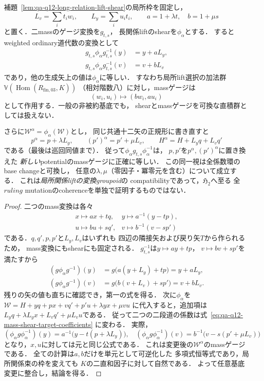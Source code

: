 \begin{proposition}[massゲージと長関係liftのshearの半直積関係]
\label{prop:qa-q12-mass-shear-compatibility}
補題~\ref{lem:qa-q12-long-relation-lift-shear}の局所枠を固定し，
\[
 L_v=\sum_i t_iw_i,\qquad L_y=\sum_i u_it_i,\qquad
 a=1+\lambda t,\quad b=1+\mu s
\]
と置く．二massのゲージ変換を$g_{t,s}$，
長関係liftのshearを$\phi_\alpha$とする．
するとweighted ordinary道代数の変換として
\[
 \begin{aligned}
 g_{t,s}\phi_\alpha g_{t,s}^{-1}(y)&=y+aL_y,\\
 g_{t,s}\phi_\alpha g_{t,s}^{-1}(v)&=v+bL_v
 \end{aligned}
 \tag{MS}\label{eq:qa-q12-mass-shear-conjugation}
\]
であり，他の生成矢上の値は$\phi_\alpha$に等しい．
すなわち局所lift選択の加法群
$\mathbb V(\operatorname{Hom}(R_{{\mathrm{fin}},03},K))$
（相対階数八）に対し，massゲージは
\[
 (w_i,u_i)\longmapsto(bw_i,au_i)
\]
として作用する．一般の非被約基底でも，
shearとmassゲージを可換な直積群としては扱えない．

さらに$\mathcal W^\alpha=\phi_\alpha(\mathcal W)$とし，
同じ共通十二矢の正規形に書き直すと
\[
 p^\alpha=p+\lambda L_y,\qquad
 (p')^\alpha=p'+\mu L_v,\qquad
 H^\alpha=H+L_yq+L_vq'
 \tag{TC}\label{eq:qa-q12-mass-shear-target-coefficients}
\]
である（最後は巡回同値まで）．
従って$\phi_\alpha g_{t,s}\phi_\alpha^{-1}$は，
$p,p'$を$p^\alpha,(p')^\alpha$に置き換えた
\emph{新しい}potentialのmassゲージに正確に等しい．
この同一視は全係数環のbase changeと可換し，
任意の$\lambda,\mu$（零因子・冪零元を含む）について成立する．
これは\emph{局所関係liftの変換groupoid}の
compatibilityであって，$\mathfrak H_2$へ至る
全$ruling$ mutationのcoherenceを単独で証明するものではない．
\end{proposition}
\begin{proof}
二つのmass変換は各々
\[
 \begin{array}{ll}
 x\mapsto ax+tq,&y\mapsto a^{-1}(y-tp),\\
 u\mapsto bu+sq',&v\mapsto b^{-1}(v-sp')
 \end{array}
\]
である．$q,q',p,p'$と$L_y,L_v$はいずれも
四辺の隣接矢および戻り矢$T$から作られるため，
mass変換にもshearにも固定される．
$g_{t,s}^{-1}$は$y\mapsto ay+tp$，
$v\mapsto bv+sp'$を満たすから
\[
 \begin{aligned}
 (g\phi_\alpha g^{-1})(y)
 &=g\bigl(a(y+L_y)+tp\bigr)
  =y+aL_y,\\
 (g\phi_\alpha g^{-1})(v)
 &=g\bigl(b(v+L_v)+sp'\bigr)
  =v+bL_v .
 \end{aligned}
\]
残りの矢の値も直ちに確認でき，第一の式を得る．
次に$\phi_\alpha$を
$\mathcal W=H+yq+px+vq'+p'u+\lambda yx+\mu vu$
に代入すると，追加項は
$L_yq+\lambda L_yx+L_vq'+\mu L_vu$である．
従って二つの二段道の係数は式~\eqref{eq:qa-q12-mass-shear-target-coefficients}
に変わる．
実際，
\[
 (\phi_\alpha g\phi_\alpha^{-1})(y)
 =a^{-1}\bigl(y-t(p+\lambda L_y)\bigr),
 \quad
 (\phi_\alpha g\phi_\alpha^{-1})(v)
 =b^{-1}\bigl(v-s(p'+\mu L_v)\bigr)
\]
となり，$x,u$に対しては元と同じ公式である．
これは変更後の$\mathcal W^\alpha$のmassゲージである．
全ての計算は$a,b$だけを単元として可逆化した
多項式恒等式であり，局所関係束の枠を変えても
$K$の二直和因子に対して自然である．
よって任意基底変更に整合し，結論を得る．
\end{proof}


